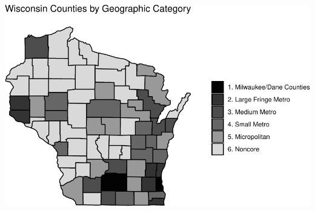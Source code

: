 \documentclass[10pt,]{article}
\begin{document}
\includegraphics{nchs_scratch_files/figure-latex/unnamed-chunk-7-1.pdf}
\end{document}
